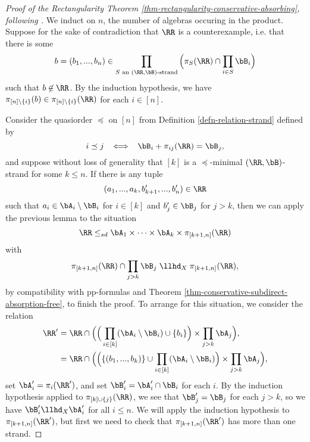 \begin{proof}[Proof of the Rectangularity Theorem \ref{thm-rectangularity-conservative-absorbing}, following \cite{barto-conservative-revisited}] We induct on $n$, the number of algebras occuring in the product. Suppose for the sake of contradiction that $\RR$ is a counterexample, i.e. that there is some
\[
b = (b_1, ..., b_n) \in \prod_{S\text{ an }(\RR,\bB)\text{-strand}} \Big(\pi_S(\RR) \cap \prod_{i\in S}\bB_i\Big)
\]
such that $b \not\in \RR$. By the induction hypothesis, we have $\pi_{[n]\setminus\{i\}}(b) \in \pi_{[n]\setminus\{i\}}(\RR)$ for each $i \in [n]$.

Consider the quasiorder $\preceq$ on $[n]$ from Definition \ref{defn-relation-strand} defined by
\[
i \preceq j \;\; \iff \;\; \bB_i + \pi_{ij}(\RR) = \bB_j,
\]
and suppose without loss of generality that $[k]$ is a $\preceq$-minimal $(\RR,\bB)$-strand for some $k \le n$. If there is any tuple
\[
(a_1, ..., a_k, b_{k+1}', ..., b_n') \in \RR
\]
such that $a_i \in \bA_i\setminus \bB_i$ for $i \in [k]$ and $b_j' \in \bB_j$ for $j > k$, then we can apply the previous lemma to the situation
\[
\RR \le_{sd} \bA_1 \times \cdots \times \bA_k \times \pi_{[k+1,n]}(\RR)
\]
with
\[
\pi_{[k+1,n]}(\RR) \cap \prod_{j > k} \bB_j \; \llhd_X \; \pi_{[k+1,n]}(\RR),
\]
by compatibility with pp-formulas and Theorem \ref{thm-conservative-subdirect-absorption-free}, to finish the proof. To arrange for this situation, we consider the relation
\begin{align*}
\RR' &= \RR \cap \Big(\Big(\prod_{i\in [k]} (\bA_i\setminus \bB_i)\cup\{b_i\}\Big) \times \prod_{j>k} \bA_j \Big),\\
&= \RR \cap \Big(\Big(\{(b_1, ..., b_k)\} \cup \prod_{i\in [k]} (\bA_i\setminus \bB_i)\Big) \times \prod_{j>k} \bA_j \Big),
\end{align*}
set $\bA_i' = \pi_i(\RR')$, and set $\bB_i' = \bA_i' \cap \bB_i$ for each $i$. By the induction hypothesis applied to $\pi_{[k]\cup\{j\}}(\RR)$, we see that $\bB_j' = \bB_j$ for each $j > k$, so we have $\bB_i' \llhd_X \bA_i'$ for all $i \le n$. We will apply the induction hypothesis to $\pi_{[k+1,n]}(\RR')$, but first we need to check that $\pi_{[k+1,n]}(\RR')$ has more than one strand.


\end{proof}
